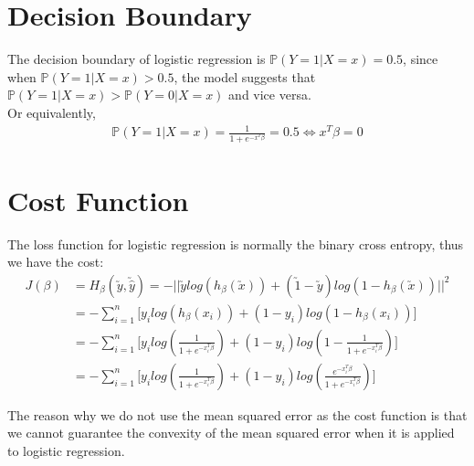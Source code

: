 \documentclass[12pt,a4paper]{article}
\begin{document}
\section{Decision Boundary}
The decision boundary of logistic regression is $\mathbb{P}(Y=1|X=x) = 0.5$, since when ${\mathbb{P}(Y=1|X=x) > 0.5}$, the model suggests that $\mathbb{P}(Y=1|X=x) > \mathbb{P}(Y=0|X=x)$ and vice versa.\\

Or equivalently,
\begin{align}
\mathbb{P}(Y=1|X=x)= \frac{1}{1+e^{-x^T\beta}} = 0.5 \iff x^T\beta = 0
\end{align}

\section{Cost Function}
The loss function for logistic regression is normally the binary cross entropy, thus we have the cost:
\begin{align}
J(\beta)&=H_\beta(\utilde{y}, \utilde{\hat{y}})=-||\utilde{y}log(h_\beta(\utilde{x}))+(\utilde{1}-\utilde{y})log(1-h_\beta(\utilde{x}))||^2\\
&=-\sum_{i=1}^n \Big[y_ilog(h_\beta(x_i)) + (1-y_i)log(1-h_\beta(x_i))\Big]\\
&=-\sum_{i=1}^n \Big[y_ilog(\frac{1}{1+e^{-x_i^T\beta}}) + (1-y_i)log(1-\frac{1}{1+e^{-x_i^T\beta}})\Big]\\
&=-\sum_{i=1}^n \Big[y_ilog(\frac{1}{1+e^{-x_i^T\beta}}) + (1-y_i)log(\frac{e^{-x_i^T\beta}}{1+e^{-x_i^T\beta}})\Big]
\end{align}

The reason why we do not use the mean squared error as the cost function is that we cannot guarantee the convexity of the mean squared error when it is applied to logistic regression.
\end{document}
